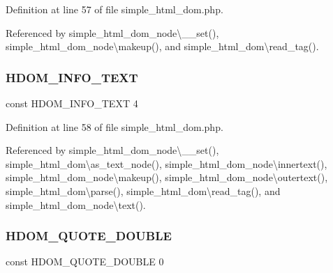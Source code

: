 Definition at line 57 of file simple\+\_\+html\+\_\+dom.\+php.



Referenced by simple\+\_\+html\+\_\+dom\+\_\+node\textbackslash{}\+\_\+\+\_\+set(), simple\+\_\+html\+\_\+dom\+\_\+node\textbackslash{}makeup(), and simple\+\_\+html\+\_\+dom\textbackslash{}read\+\_\+tag().

\hypertarget{simple__html__dom_8php_a12f107a4dccc35d4321ff20028fbd476}{}\label{simple__html__dom_8php_a12f107a4dccc35d4321ff20028fbd476} 
\subsubsection{\texorpdfstring{H\+D\+O\+M\+\_\+\+I\+N\+F\+O\+\_\+\+T\+E\+XT}{HDOM\_INFO\_TEXT}}
{\footnotesize\ttfamily const H\+D\+O\+M\+\_\+\+I\+N\+F\+O\+\_\+\+T\+E\+XT 4}



Definition at line 58 of file simple\+\_\+html\+\_\+dom.\+php.



Referenced by simple\+\_\+html\+\_\+dom\+\_\+node\textbackslash{}\+\_\+\+\_\+set(), simple\+\_\+html\+\_\+dom\textbackslash{}as\+\_\+text\+\_\+node(), simple\+\_\+html\+\_\+dom\+\_\+node\textbackslash{}innertext(), simple\+\_\+html\+\_\+dom\+\_\+node\textbackslash{}makeup(), simple\+\_\+html\+\_\+dom\+\_\+node\textbackslash{}outertext(), simple\+\_\+html\+\_\+dom\textbackslash{}parse(), simple\+\_\+html\+\_\+dom\textbackslash{}read\+\_\+tag(), and simple\+\_\+html\+\_\+dom\+\_\+node\textbackslash{}text().

\hypertarget{simple__html__dom_8php_a827ba5d43b28b0019b25bfdc4c7e2715}{}\label{simple__html__dom_8php_a827ba5d43b28b0019b25bfdc4c7e2715} 
\subsubsection{\texorpdfstring{H\+D\+O\+M\+\_\+\+Q\+U\+O\+T\+E\+\_\+\+D\+O\+U\+B\+LE}{HDOM\_QUOTE\_DOUBLE}}
{\footnotesize\ttfamily const H\+D\+O\+M\+\_\+\+Q\+U\+O\+T\+E\+\_\+\+D\+O\+U\+B\+LE 0}



